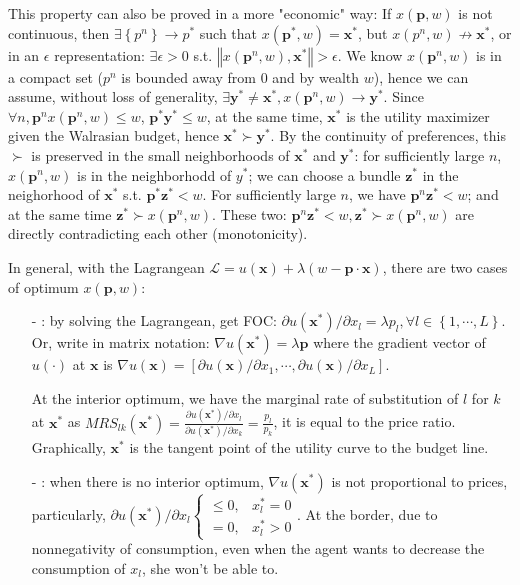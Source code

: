 \begin{enumerate}
    This property can also be proved in a more "economic" way: If $ x(\mathbf{p},w)$ is not continuous, then $\exists\left\{p^n\right\}\rightarrow p^*$ such that $ x(\mathbf{p}^*,w)=\mathbf{x}^*$, but $ x(p^n,w)\not\rightarrow \mathbf{x}^*$, or in an $\epsilon$ representation: $\exists \epsilon>0$ s.t. $\left\Vert  x(\mathbf{p}^n,w),\mathbf{x}^* \right\Vert >\epsilon$. 
    We know $ x(\mathbf{p}^n,w)$ is in a compact set ($p^n$ is bounded away from 0 and by wealth $w$), hence we can assume, without loss of generality, $\exists \mathbf{y}^*\neq \mathbf{x}^*,  x(\mathbf{p}^n,w)\rightarrow \mathbf{y}^*$. Since $\forall n,\mathbf{p}^n x(\mathbf{p}^n,w)\leq w$, $\mathbf{p}^*\mathbf{y}^* \leq w$, at the same time, $\mathbf{x}^*$ is the utility maximizer given the Walrasian budget, hence $\mathbf{x}^*\succ \mathbf{y}^*$.
    By the continuity of preferences, this $\succ$ is preserved in the small neighborhoods of $\mathbf{x}^*$ and $\mathbf{y}^*$: for sufficiently large $n$, $ x(\mathbf{p}^n,w)$ is in the neighborhodd of $y^*$; we can choose a bundle $\mathbf{z}^*$ in the neighorhood of $\mathbf{x}^*$ s.t. $\mathbf{p}^* \mathbf{z}^*<w$. For sufficiently large $n$, we have $\mathbf{p}^n\mathbf{z}^*<w$; and at the same time $\mathbf{z}^*\succ  x(\mathbf{p}^n,w)$. These two: $\mathbf{p}^n\mathbf{z}^*<w,\mathbf{z}^*\succ  x(\mathbf{p}^n,w)$ are directly contradicting each other (monotonicity).
\end{enumerate}

In general, with the Lagrangean $\mathcal{L}=u(\mathbf{x})+\lambda (w-\mathbf{p}\cdot\mathbf{x})$, there are two cases of optimum $ x(\mathbf{p},w)$:
\begin{enumerate}
    \item[-] : by solving the Lagrangean, get FOC: $\partial u(\mathbf{x}^*)/\partial x_l= \lambda p_l,\forall l\in \left\{1,\cdots,L\right\}$. Or, write in matrix notation: $\nabla u(\mathbf{x}^*)=\lambda \mathbf{p}$ where the gradient vector of $u(\cdot)$ at $\mathbf{x}$ is $\nabla u(\mathbf{x})=\left[\partial u(\mathbf{x})/\partial x_1,\cdots, \partial u(\mathbf{x})/\partial x_L\right]$.
    
    At the interior optimum, we have the marginal rate of substitution of $l$ for $k$ at $\mathbf{x}^*$ as $MRS_{lk}(\mathbf{x}^*)=\frac{\partial u(\mathbf{x}^*)/\partial x_l}{\partial u(\mathbf{x}^*)/\partial x_k}=\frac{p_l}{p_k}$, it is equal to the price ratio. Graphically, $\mathbf{x}^*$ is the tangent point of the utility curve to the budget line.
    \item[-] : when there is no interior optimum, $\nabla u(\mathbf{x}^*)$ is not proportional to prices, particularly, $\partial u(\mathbf{x}^*)/\partial x_l\begin{cases}\leq 0, & x^*_l=0 \\ =0 , & x^*_l>0\end{cases}$. At the border, due to nonnegativity of consumption, even when the agent wants to decrease the consumption of $x_l$, she won't be able to.
\end{enumerate}

